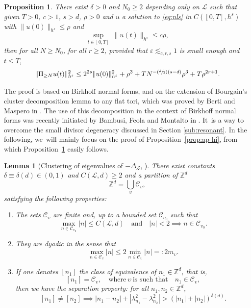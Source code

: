 \documentclass[10pt,a4paper]{amsart}
\newcommand{\Psfrac}[2]{(\sfrac{#1}{#2})}
\theoremstyle{plain}
\newtheorem{proposition}[theorem]{Proposition}
\newtheorem{lemma}[theorem]{Lemma}
\theoremstyle{definition}
\newcommand{\Z}{\mathbb{Z}}
\newcommand{\1}{\mathbf{1}}
\begin{document}
\begin{proposition}
\label{prop:high_modes} There exist $\delta >0$ and $N_0\geq 2$ depending only on $\mathscr{L}$ such that given $T>0$, $c>1$, $s>d$, $\rho>0$ and $u$ a solution to \eqref{eq:nls} in $C([0,T],h^{s})$ with $\|u(0)\|_{h^{s}} \leq \rho$ and
\begin{equation}
\label{eq:as-ap}
\underset{t\in[0,T]}{\sup}\ \|u(t)\|_{h^{s}}\leq c\rho,
\end{equation}
then for all $N\geq N_0$, for all $r\geq2$, provided that $\varepsilon \lesssim_{c,r,s} 1$ is small enough and $t\leq T$,
\[
\| \Pi_{\geq N} u(t) \|_{h^s}^2 \leq 2^{2s} \| u(0) \|_{h^s}^2 + \rho^3 + TN^{-\Psfrac{\delta}{2}(s-d)} \rho^{3}+T \rho^{2r+1}.
\]
\end{proposition}

The proof is based on Birkhoff normal forms, and on the extension of Bourgain's cluster decomposition lemma \cite{Bou98} to any flat tori, which was proved by Berti and Maspero in \cite[Th.\,2.1]{Berti-Maspero-19}. The use of this decomposition in the context of Birkhoff normal forms was recently initiated by Bambusi, Feola and Montalto in \cite{BFM22}. It~is a way to overcome the small divisor degeneracy discussed in Section \ref{sub:resonant}. In the following, we~will mainly focus on the proof of Proposition~\ref{prop:ap-hi}, from which Proposition~\ref{prop:high_modes} easily follows.

\begin{lemma}[Clustering of eigenvalues of $-\Delta_\mathscr{L}$, {\cite[Th.\,2.1]{Berti-Maspero-19}}]
\label{lem:cluster}
There exist constants $\delta \equiv \delta(d) \in (0,1)$ and $C(\mathscr{L},d)\geq 2$ and a partition of $\Z^d$
\[
\Z^d = \bigcup_{\upsilon }\mathscr{C}_\upsilon,
\]
satisfying the following properties:
\begin{enumerate}
\item The sets $\mathscr{C}_\upsilon$ are finite and, up to a bounded set $\mathscr{C}_{\upsilon_0}$ such that
\[
\underset{n\in \mathscr{C}_{\upsilon_0}}{\max} |n| \leq C(\mathscr{L},d) \quad \mathrm{and} \quad |n| < 2 \implies n\in \mathscr{C}_{\upsilon_0}.
\]
\item They are dyadic in the sense that
\begin{equation}
\label{eq:dydy}
\underset{n\in\mathscr{C}_{{\upsilon}}}{\max} |n| \leq 2\underset{n\in\mathscr{C}_{{\upsilon}}}{\min} |n| =: 2m_\upsilon.
\end{equation}
\item If one denotes $[n_1]$ the class of equivalence of $n_1\in\Z^d$, that is,
\[
[n_1] = \mathscr{C}_\upsilon,\quad \text{where}\ \upsilon\ \text{is such that}\quad n_1\in\mathscr{C}_\upsilon,
\]
then we have the separation property: for all $n_1,n_2\in\Z^d$,
\[
[n_1]\neq[n_2]\implies |n_1-n_2| + |\lambda_{n_{1}}^{2}-\lambda_{n_{2}}^{2}| > (|n_1|+|n_2|)^{\delta(d)}.
\]
\end{enumerate}
\end{lemma}
\end{document}
